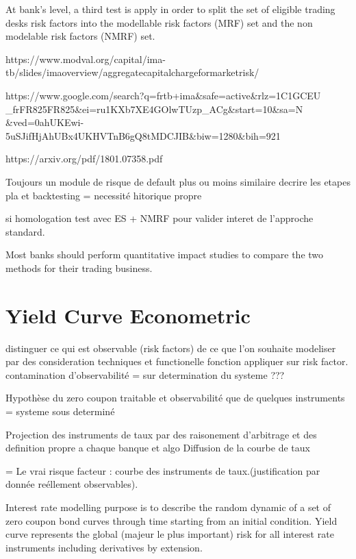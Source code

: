 \documentclass[3pt]{article}
\begin{document}
\bigskip

At bank's level, a third test is apply in order to split the set of eligible
trading desks risk factors into the modellable risk factors (MRF) set and
the non modelable risk factors (NMRF) set.

\bigskip 

\bigskip 

\bigskip
https://www.modval.org/capital/ima-tb/slides/imaoverview/aggregatecapitalchargeformarketrisk/

https://www.google.com/search?q=frtb+ima\&safe=active\&rlz=1C1GCEU%
\_frFR825FR825\&ei=ru1KXb7XE4GOlwTUzp\_ACg\&start=10\&sa=N%
\&ved=0ahUKEwi-5uSJifHjAhUBx4UKHVTnB6gQ8tMDCJIB\&biw=1280\&bih=921

https://arxiv.org/pdf/1801.07358.pdf\bigskip 

Toujours un module de risque de default plus ou moins similaire decrire les
etapes pla et backtesting =\TEXTsymbol{>} necessit\'{e} hitorique propre

si homologation test avec ES + NMRF pour valider interet de l'approche
standard.

Most banks should perform quantitative impact studies to compare the two
methods for their trading business.

\section{Yield Curve Econometric}

\bigskip distinguer ce qui est observable (risk factors) de ce que l'on
souhaite modeliser par des consideration techniques et functionelle fonction
appliquer sur risk factor. contamination d'observabilit\'{e} =\TEXTsymbol{>}
sur determination du systeme ???

Hypoth\`{e}se du zero coupon traitable et observabilit\'{e} que de quelques
instruments =\TEXTsymbol{>} systeme sous determin\'{e}

Projection des instruments de taux par des raisonement d'arbitrage et des
definition propre a chaque banque et algo Diffusion de la courbe de taux

=\TEXTsymbol{>} Le vrai risque facteur : courbe des instruments de
taux.(justification par donn\'{e}e re\'{e}llement observables).

Interest rate modelling purpose is to describe the random dynamic of a set
of zero coupon bond curves through time starting from an initial condition.
Yield curve represents the global (majeur le plus important) risk for all
interest rate instruments including derivatives by extension.
\end{document}
